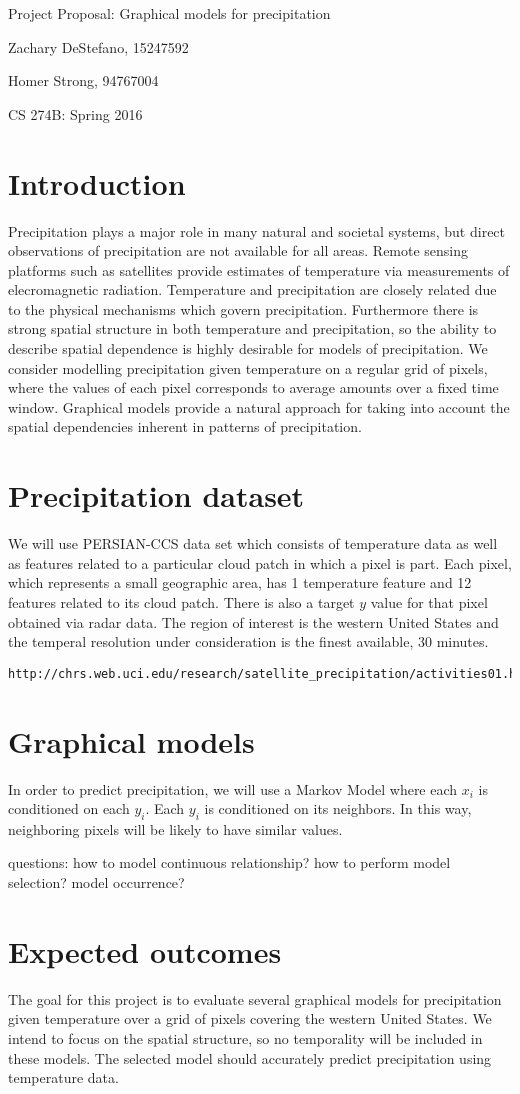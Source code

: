 \documentclass[twoside,11pt]{article}
\theoremstyle{definition}
\begin{document}
\centerline{\Large Project Proposal: Graphical models for precipitation}
\centerline{Zachary DeStefano, 15247592}
\centerline{Homer Strong, 94767004}
\centerline{CS 274B: Spring 2016}

\section*{Introduction}
Precipitation plays a major role in many natural and societal systems, but direct observations of precipitation are not available for all areas. Remote sensing platforms such as satellites provide estimates of temperature via measurements of elecromagnetic radiation. Temperature and precipitation are closely related due to the physical mechanisms which govern precipitation. Furthermore there is strong spatial structure in both temperature and precipitation, so the ability to describe spatial dependence is highly desirable for models of precipitation. We consider modelling precipitation given temperature on a regular grid of pixels, where the values of each pixel corresponds to average amounts over a fixed time window. Graphical models provide a natural approach for taking into account the spatial dependencies inherent in patterns of precipitation.

\section*{Precipitation dataset}
We will use PERSIAN-CCS data set which consists of temperature data as well as features related to a particular cloud patch in which a pixel is part. Each pixel, which represents a small geographic area, has 1 temperature feature and 12 features related to its cloud patch. There is also a target $y$ value for that pixel obtained via radar data. The region of interest is the western United States and the temperal resolution under consideration is the finest available, 30 minutes.

\begin{lstlisting}
http://chrs.web.uci.edu/research/satellite_precipitation/activities01.html
\end{lstlisting}

\section*{Graphical models}
In order to predict precipitation, we will use a Markov Model where each $x_i$ is conditioned on each $y_i$. Each $y_i$ is conditioned on its neighbors. In this way, neighboring pixels will be likely to have similar values.

questions:
how to model continuous relationship?
how to perform model selection?
model occurrence?

\section*{Expected outcomes}
The goal for this project is to evaluate several graphical models for precipitation given temperature over a grid of pixels covering the western United States. We intend to focus on the spatial structure, so no temporality will be included in these models. The selected model should accurately predict precipitation using temperature data.
\end{document}
